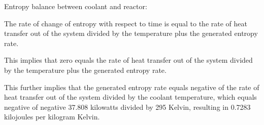 Entropy balance between coolant and reactor:

The rate of change of entropy with respect to time is equal to the rate of heat transfer out of the system divided by the temperature plus the generated entropy rate.

This implies that zero equals the rate of heat transfer out of the system divided by the temperature plus the generated entropy rate.

This further implies that the generated entropy rate equals negative of the rate of heat transfer out of the system divided by the coolant temperature, which equals negative of negative 37.808 kilowatts divided by 295 Kelvin, resulting in 0.7283 kilojoules per kilogram Kelvin.